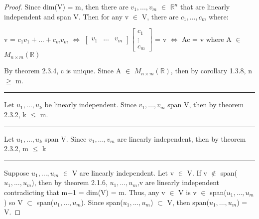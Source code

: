     \begin{proof}
        Since dim(V) = m, then there are $v_1,...,v_m$ $\in$ $\mathbb{R}^n$
        that are linearly independent and span V.
        Then for any v $\in$ V, there are $c_1,...,c_m$ where:

        \hspace{0.5cm}
        v = $c_1v_1 + ... + c_mv_m$
        \hspace{0.2cm}
        $\Leftrightarrow$
        \hspace{0.2cm}
        \footnotesize
        $\begin{bmatrix}
            v_1 & ... & v_m
        \end{bmatrix}
        \begin{bmatrix}
            c_1 \\
            \vdots \\
            c_m
        \end{bmatrix}$
        \normalsize
        = v
        \hspace{0.2cm}
        $\Leftrightarrow$
        \hspace{0.2cm}
        Ac = v
        \hspace{0.5cm}
        where A $\in$ $M_{n \times m}(\mathbb{R})$

        By {\color{red} theorem 2.3.4}, c is unique.
        Since A $\in$ $M_{n \times m}(\mathbb{R})$,
        then by {\color{orange} corollary 1.3.8}, n $\geq$ m.

        \rule[0.1cm]{16.7cm}{0.01cm}

        Let $u_1,...,u_k$ be linearly independent.
        Since $v_1,...,v_m$ span V, then
        by {\color{red} theorem 2.3.2}, k $\leq$ m.

        \rule[0.1cm]{16.7cm}{0.01cm}

        Let $u_1,...,u_k$ span V.
        Since $v_1,...,v_m$ are linearly independent, then
        by {\color{red} theorem 2.3.2}, m $\leq$ k
        
        \rule[0.1cm]{16.7cm}{0.01cm}

        Suppose $u_1,...,u_m$ $\in$ V are linearly independent.
        Let v $\in$ V.
        If v $\not \in$ span($u_1,...,u_m$), then
        by {\color{red} theorem 2.1.6}, $u_1,...,u_m$,v are linearly independent
        contradicting that m+1 = dim(V) = m.
        Thus, any v $\in$ V is v $\in$ span($u_1,...,u_m$) so
        V $\subset$ span($u_1,...,u_m$). Since span($u_1,...,u_m$) $\subset$ V,
        then span($u_1,...,u_m$) = V.


\end{proof}
